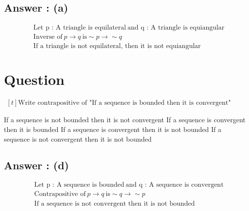 \documentclass[17pt]{extarticle}
\begin{document}
\begin{fleqn}
\subsection*{Answer : (a)}
\begin{equation} \nonumber
\begin{alignedat}{4}
& \text {Let p : A triangle is equilateral}   
 \ \text {and q : A triangle is equiangular} \\ 
& \text {Inverse of} \ p \to q \ \text {is} \sim p \to \sim q\\
& \text {If a triangle is not equilateral, then it is not equiangular } 
\end{alignedat}
\end{equation}

\section{Question} 

$\begin{aligned}[t] 
\text {Write contrapositive of "If a sequence is bounded then it is convergent" } 
\end{aligned}$

\begin{tasks}
  \task If a sequence is not bounded then it is not convergent 
  \task If a sequence is convergent then it is bounded 
  \task If a sequence is convergent then it is not bounded
  \task If a sequence is not convergent then it is not bounded
\end{tasks}
\subsection*{Answer : (d)}
\begin{equation} \nonumber
\begin{alignedat}{4}
& \text {Let p : A sequence is bounded} 
 \ \text {and q : A sequence is convergent} \\ 
& \text {Contrapositive of} \ p \to q \ \text {is} \sim q \to \sim p\\
& \text {If a sequence is not convergent then it is not bounded } 
\end{alignedat}
\end{equation}


\end{fleqn}
\end{document}
